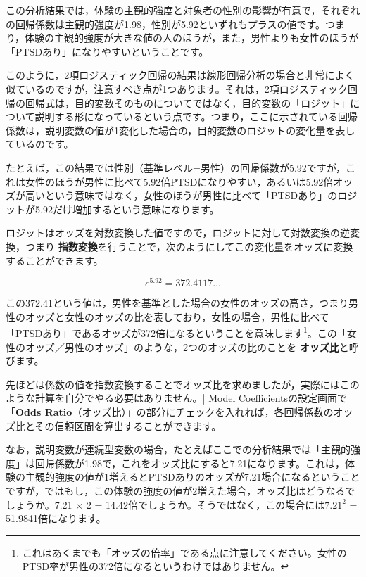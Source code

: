 \documentclass[
  12pt,
  a5jpaper,
  lualatex, ja=standard]{bxjsbook}
\renewcommand{\emph}[1]{\textbf{\color{emph} #1}}
\begin{document}
この分析結果では，体験の主観的強度と対象者の性別の影響が有意で，それぞれの回帰係数は主観的強度が1.98，性別が5.92といずれもプラスの値です。つまり，体験の主観的強度が大きな値の人のほうが，また，男性よりも女性のほうが「PTSDあり」になりやすいということです。

このように，2項ロジスティック回帰の結果は線形回帰分析の場合と非常によく似ているのですが，注意すべき点が1つあります。それは，2項ロジスティック回帰の回帰式は，目的変数そのものについてではなく，目的変数の「ロジット」について説明する形になっているという点です。つまり，ここに示されている回帰係数は，説明変数の値が1変化した場合の，目的変数のロジットの変化量を表しているのです。

たとえば，この結果では性別（基準レベル=男性）の回帰係数が5.92ですが，これは女性のほうが男性に比べて5.92倍PTSDになりやすい，あるいは5.92倍オッズが高いという意味ではなく，女性のほうが男性に比べて「PTSDあり」のロジットが5.92だけ増加するという意味になります。

ロジットはオッズを対数変換した値ですので，ロジットに対して対数変換の逆変換，つまり\emph{指数変換}を行うことで，次のようにしてこの変化量をオッズに変換することができます。

\[
 e^{5.92} = 372.4117\dots
\]

この372.41という値は，男性を基準とした場合の女性のオッズの高さ，つまり男性のオッズと女性のオッズの比を表しており，女性の場合，男性に比べて「PTSDあり」であるオッズが372倍になるということを意味します\footnote{これはあくまでも「オッズの倍率」である点に注意してください。女性のPTSD率が男性の372倍になるというわけではありません。}。この「女性のオッズ／男性のオッズ」のような，2つのオッズの比のことを\emph{オッズ比}と呼びます。

先ほどは係数の値を指数変換することでオッズ比を求めましたが，実際にはこのような計算を自分でやる必要はありません。\colorbox{bar}{\textcolor{gmoji2}{| Model Coefficients}}の設定画面で「\textbf{Odds Ratio}（オッズ比）」の部分にチェックを入れれば，各回帰係数のオッズ比とその信頼区間を算出することができます。

なお，説明変数が連続型変数の場合，たとえばここでの分析結果では「主観的強度」は回帰係数が1.98で，これをオッズ比にすると7.21になります。これは，体験の主観的強度の値が1増えるとPTSDありのオッズが7.21場合になるということですが，ではもし，この体験の強度の値が2増えた場合，オッズ比はどうなるでしょうか。7.21 × 2 = 14.42倍でしょうか。そうではなく，この場合には\(7.21^2\) = 51.9841倍になります。
\end{document}

